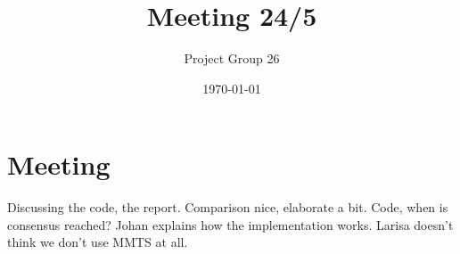 \documentclass{article}
\title{Meeting 24/5}
\author{Project Group 26}
\date{\today}
\begin{document}
\maketitle

\section{Meeting}

Discussing the code, the report. Comparison nice, elaborate a bit. Code, when is consensus reached? Johan explains how the implementation works. Larisa doesn't think we don't use MMTS at all. 
\end{document}
